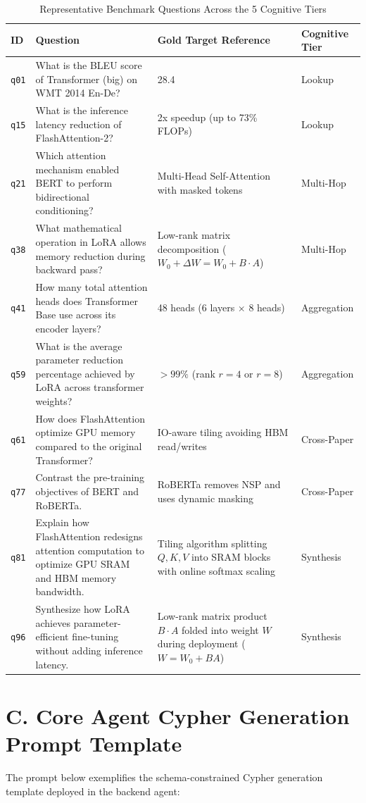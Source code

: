 \begin{table}[htbp]
\centering
\small
\caption{Representative Benchmark Questions Across the 5 Cognitive Tiers}
\label{tab:extended_questions}
\begin{tabularx}{\textwidth}{l p{5.5cm} p{4.5cm} X}
\toprule
\textbf{ID} & \textbf{Question} & \textbf{Gold Target Reference} & \textbf{Cognitive Tier} \\
\midrule
\texttt{q01} & What is the BLEU score of Transformer (big) on WMT 2014 En-De? & 28.4 & Lookup \\
\texttt{q15} & What is the inference latency reduction of FlashAttention-2? & 2x speedup (up to 73\% FLOPs) & Lookup \\
\texttt{q21} & Which attention mechanism enabled BERT to perform bidirectional conditioning? & Multi-Head Self-Attention with masked tokens & Multi-Hop \\
\texttt{q38} & What mathematical operation in LoRA allows memory reduction during backward pass? & Low-rank matrix decomposition ($W_0 + \Delta W = W_0 + B \cdot A$) & Multi-Hop \\
\texttt{q41} & How many total attention heads does Transformer Base use across its encoder layers? & 48 heads (6 layers $\times$ 8 heads) & Aggregation \\
\texttt{q59} & What is the average parameter reduction percentage achieved by LoRA across transformer weights? & $> 99\%$ (rank $r=4$ or $r=8$) & Aggregation \\
\texttt{q61} & How does FlashAttention optimize GPU memory compared to the original Transformer? & IO-aware tiling avoiding HBM read/writes & Cross-Paper \\
\texttt{q77} & Contrast the pre-training objectives of BERT and RoBERTa. & RoBERTa removes NSP and uses dynamic masking & Cross-Paper \\
\texttt{q81} & Explain how FlashAttention redesigns attention computation to optimize GPU SRAM and HBM memory bandwidth. & Tiling algorithm splitting $Q, K, V$ into SRAM blocks with online softmax scaling & Synthesis \\
\texttt{q96} & Synthesize how LoRA achieves parameter-efficient fine-tuning without adding inference latency. & Low-rank matrix product $B \cdot A$ folded into weight $W$ during deployment ($W = W_0 + BA$) & Synthesis \\
\bottomrule
\end{tabularx}
\end{table}

\section*{C. Core Agent Cypher Generation Prompt Template}
The prompt below exemplifies the schema-constrained Cypher generation template deployed in the backend agent:

